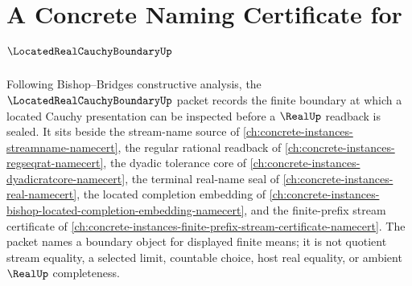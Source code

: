 \chapter{A Concrete Naming Certificate for $\LocatedRealCauchyBoundaryUp$}
\label{ch:concrete-instances-located-real-cauchy-boundary-namecert}

Following Bishop--Bridges constructive analysis, the $\LocatedRealCauchyBoundaryUp$ packet records the finite boundary at which a located Cauchy presentation can be inspected before a $\RealUp$ readback is sealed. It sits beside the stream-name source of \autoref{ch:concrete-instances-streamname-namecert}, the regular rational readback of \autoref{ch:concrete-instances-regseqrat-namecert}, the dyadic tolerance core of \autoref{ch:concrete-instances-dyadicratcore-namecert}, the terminal real-name seal of \autoref{ch:concrete-instances-real-namecert}, the located completion embedding of \autoref{ch:concrete-instances-bishop-located-completion-embedding-namecert}, and the finite-prefix stream certificate of \autoref{ch:concrete-instances-finite-prefix-stream-certificate-namecert}. The packet names a boundary object for displayed finite means; it is not quotient stream equality, a selected limit, countable choice, host real equality, or ambient $\RealUp$ completeness.

